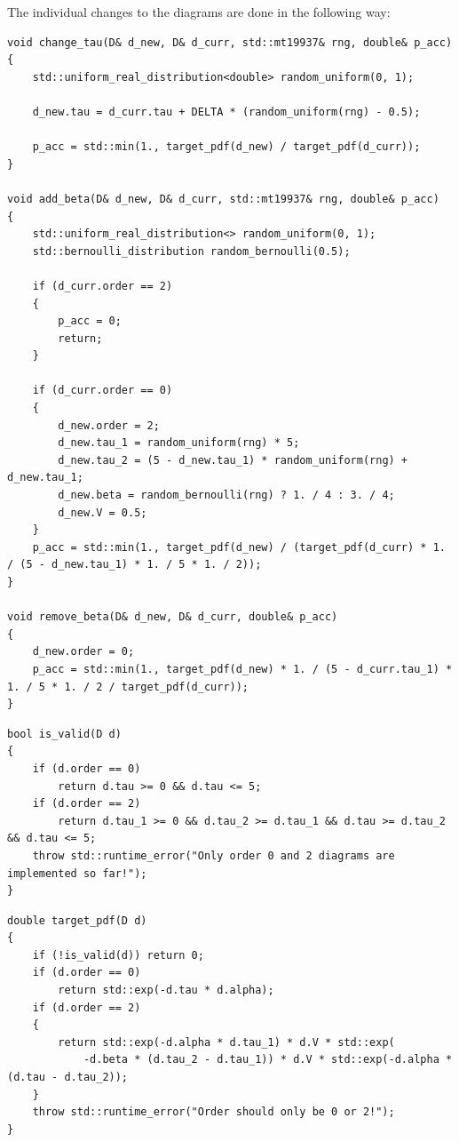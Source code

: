 \documentclass[a4paper, 11pt]{article}          %
\begin{document}
\begin{landscape}
    The individual changes to the diagrams are done in the following way:

    \begin{lstlisting}[style=cppstyle, caption={Examples of proposed changes to the diagram. They propose some new move and calculate the Metropolis-Hastings step and write to p\_acc with the result}, label={lst:changes}]
        void change_tau(D& d_new, D& d_curr, std::mt19937& rng, double& p_acc)
{
    std::uniform_real_distribution<double> random_uniform(0, 1);

    d_new.tau = d_curr.tau + DELTA * (random_uniform(rng) - 0.5);

    p_acc = std::min(1., target_pdf(d_new) / target_pdf(d_curr));
}

void add_beta(D& d_new, D& d_curr, std::mt19937& rng, double& p_acc)
{
    std::uniform_real_distribution<> random_uniform(0, 1);
    std::bernoulli_distribution random_bernoulli(0.5);

    if (d_curr.order == 2)
    {
        p_acc = 0;
        return;
    }

    if (d_curr.order == 0)
    {
        d_new.order = 2;
        d_new.tau_1 = random_uniform(rng) * 5;
        d_new.tau_2 = (5 - d_new.tau_1) * random_uniform(rng) + d_new.tau_1;
        d_new.beta = random_bernoulli(rng) ? 1. / 4 : 3. / 4;
        d_new.V = 0.5;
    }
    p_acc = std::min(1., target_pdf(d_new) / (target_pdf(d_curr) * 1. / (5 - d_new.tau_1) * 1. / 5 * 1. / 2));
}

void remove_beta(D& d_new, D& d_curr, double& p_acc)
{
    d_new.order = 0;
    p_acc = std::min(1., target_pdf(d_new) * 1. / (5 - d_curr.tau_1) * 1. / 5 * 1. / 2 / target_pdf(d_curr));
}

    \end{lstlisting}

    \begin{lstlisting}[style=cppstyle, caption={Function that checks if the proposed diagram is actually valid. If not the acceptance probability is automatically set to 0}, label={lst:valid}]
        bool is_valid(D d)
{
    if (d.order == 0)
        return d.tau >= 0 && d.tau <= 5;
    if (d.order == 2)
        return d.tau_1 >= 0 && d.tau_2 >= d.tau_1 && d.tau >= d.tau_2 && d.tau <= 5;
    throw std::runtime_error("Only order 0 and 2 diagrams are implemented so far!");
}
    \end{lstlisting}

    \begin{lstlisting}[style=cppstyle, caption={The diagram weights that are being sampled.}, label={lst:target_pdf}]
double target_pdf(D d)
{
    if (!is_valid(d)) return 0;
    if (d.order == 0)
        return std::exp(-d.tau * d.alpha);
    if (d.order == 2)
    {
        return std::exp(-d.alpha * d.tau_1) * d.V * std::exp(
            -d.beta * (d.tau_2 - d.tau_1)) * d.V * std::exp(-d.alpha * (d.tau - d.tau_2));
    }
    throw std::runtime_error("Order should only be 0 or 2!");
}
    \end{lstlisting}



\end{landscape}
\end{document}
